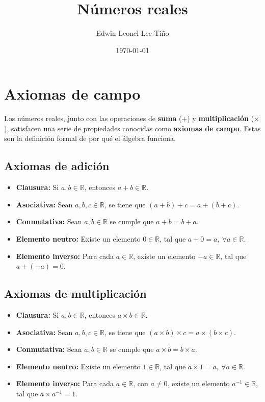 \documentclass{article}
\title{Números reales}
\author{Edwin Leonel Lee Tiño}
\date{\today}
\begin{document}
\maketitle

\section{Axiomas de campo}

Los números reales, junto con las operaciones de \textbf{suma} ($+$) y \textbf{multiplicación} ($\times$), satisfacen una serie de propiedades conocidas como \textbf{axiomas de campo}. Estas son la definición formal de por qué el álgebra funciona.

\subsection{Axiomas de adición}

\begin{itemize}
    \item \textbf{Clausura:} Si $a, b \in \mathbb{R}$, entonces $a + b \in \mathbb{R}$.
    \item \textbf{Asociativa:} Sean $a, b, c \in \mathbb{R}$, se tiene que $(a + b) + c = a + (b + c)$.
    \item \textbf{Conmutativa:} Sean $a, b \in \mathbb{R}$ se cumple que $a + b = b + a$.
    \item \textbf{Elemento neutro:} Existe un elemento $0 \in \mathbb{R}$, tal que $a + 0 = a, \ \forall a \in \mathbb{R}$.
    \item \textbf{Elemento inverso:} Para cada $a \in \mathbb{R}$, existe un elemento $-a \in \mathbb{R}$, tal que $a + (-a) = 0$. 
\end{itemize}

\subsection{Axiomas de multiplicación}

\begin{itemize}
    \item \textbf{Clausura:} Si $a, b \in \mathbb{R}$, entonces $a \times b \in \mathbb{R}$.
    \item \textbf{Asociativa:} Sean $a, b, c \in \mathbb{R}$, se tiene que $(a \times b) \times c = a \times (b \times c)$.
    \item \textbf{Conmutativa:} Sean $a, b \in \mathbb{R}$ se cumple que $a \times b = b \times a$.
    \item \textbf{Elemento neutro:} Existe un elemento $1 \in \mathbb{R}$, tal que $a \times 1 = a, \ \forall a \in \mathbb{R}$.
    \item \textbf{Elemento inverso:} Para cada $a \in \mathbb{R}$, con $a \neq 0$, existe un elemento $a^{-1} \in \mathbb{R}$, tal que $a \times a^{-1} = 1$. 
\end{itemize}
\end{document}

